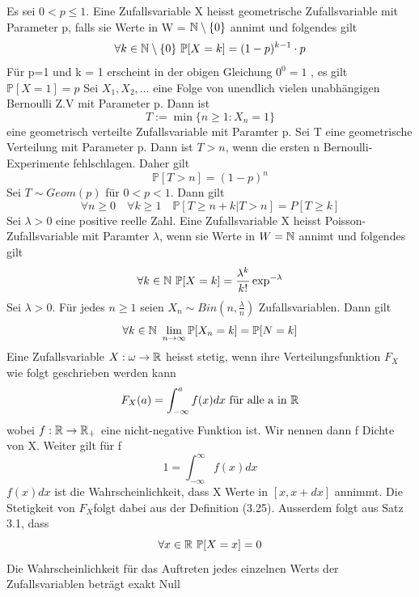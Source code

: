  \newline
Es sei \( 0 < p \leq 1\). Eine Zufallsvariable X heisst geometrische Zufallsvariable mit Parameter p, falls sie Werte in W = \( \mathbb{N} \setminus \{0\}\) annimt und folgendes gilt \[\forall k \in \N \setminus \{0\} \ \mathbb{P}[X=k] = (1-p)^{k-1} \cdot p\]
\Bem[3.16] \newline
Für p=1 und k = 1 erscheint in der obigen Gleichung \(0^0 = 1\) , es gilt \( \mathbb{P}[X=1] = p\)
\Satz[3.18] \newline
Sei \(X_1, X_2, \dots \) eine Folge von unendlich vielen unabhängigen Bernoulli Z.V mit Parameter p. Dann ist \[ T:= \min\{n \geq 1 : X_n = 1\}\] eine geometrisch verteilte Zufallsvariable mit Paramter p.
\Bem[3.18A] \newline
Sei T eine geometrische Verteilung mit Parameter p. Dann ist \( T > n\), wenn die ersten n Bernoulli-Experimente fehlschlagen. Daher gilt \[ \mathbb{P}[T > n] = (1-p)^n\]
 \newline
Sei \( T \sim Geom(p)\) für \( 0 < p < 1\). Dann gilt \[ \forall n \geq 0 \quad \forall k \geq 1 \quad \mathbb{P}[T \geq n + k | T > n] = P[T \geq k]\]
\Def[3.21] \newline
Sei \( \lambda > 0\) eine positive reelle Zahl. Eine Zufallsvariable X heisst Poisson-Zufallsvariable mit Paramter \( \lambda\), wenn sie Werte in \( W = \mathbb{N} \) annimt und folgendes gilt \[ \forall k \in \N \ \mathbb{P}[X = k] = \frac{\lambda^k}{k!}\exp^{-\lambda}\]
 \newline
Sei \( \lambda > 0\). Für jedes \( n \geq 1 \) seien \( X_n \sim Bin(n, \frac{\lambda}{n})\)  Zufallsvariablen. Dann gilt \[ \forall k \in \mathbb{N} \ \lim_{n \rightarrow \infty } \mathbb{P}[X_n = k] = \mathbb{P}[N =k]\]
 \newline
Eine Zufallsvariable \( X: \omega \rightarrow \mathbb{R} \) heisst stetig, wenn ihre Verteilungsfunktion \(F_X \) wie folgt geschrieben werden kann \[F_X(a) = \int_{-\infty}^{a} f(x)dx \ \text{für alle a in} \ \mathbb{R}\] wobei \(f: \mathbb{R} \rightarrow \mathbb{R}_+\) eine nicht-negative Funktion ist. Wir nennen dann f Dichte von X. Weiter gilt für f \[1 = \int_{-\infty}^{\infty} f(x) dx\] \newline
\Bem[3.25A] \newline
\(f(x)dx \) ist die Wahrscheinlichkeit, dass X Werte in \( [x, x+ dx]\) annimmt. Die Stetigkeit von \(F_X \)folgt dabei aus der Definition (3.25). Ausserdem folgt aus Satz 3.1, dass \[ \forall x \in \mathbb{R}  \ \mathbb{P}[X = x] = 0\]Die Wahrscheinlichkeit für das Auftreten jedes einzelnen Werts der Zufallsvariablen beträgt exakt Null\newline
